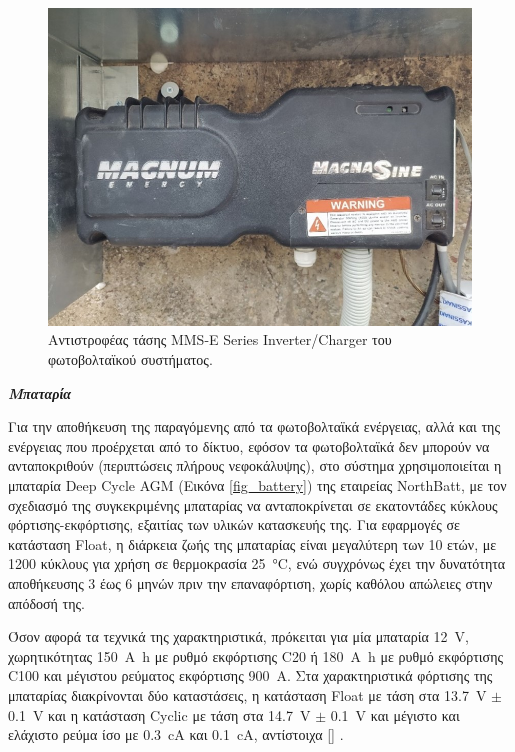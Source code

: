 \documentclass[12pt, a4paper]{report} %
\DeclareRobustCommand{\lcitep}[1]{%
  \english{[\cite{#1}]}%
}
\newcommand{\english}{\foreignlanguage{english}}
\begin{document}
\begin{figure}[ht]%
    \centering
    \includegraphics[scale=0.9]{Figures/inverter.jpg}
    \caption{Αντιστροφέας τάσης \english{MMS-E Series Inverter/Charger} του φωτοβολταϊκού συστήματος.}
    \label{fig_inverter}
\end{figure}

\noindent \textit{\textbf{Μπαταρία}}

\vspace{0.2cm}

Για την αποθήκευση της παραγόμενης από τα φωτοβολταϊκά ενέργειας, αλλά και της ενέργειας που προέρχεται από το δίκτυο, 
εφόσον τα φωτοβολταϊκά δεν μπορούν να ανταποκριθούν (περιπτώσεις πλήρους νεφοκάλυψης), στο σύστημα χρησιμοποιείται η 
μπαταρία \english{Deep Cycle AGM} (Εικόνα \ref{fig_battery}) της εταιρείας \english{NorthBatt}, με τον σχεδιασμό της 
συγκεκριμένης μπαταρίας να ανταποκρίνεται σε εκατοντάδες κύκλους φόρτισης-εκφόρτισης, εξαιτίας των υλικών κατασκευής της. 
Για εφαρμογές σε κατάσταση \english{Float}, η διάρκεια ζωής της μπαταρίας είναι μεγαλύτερη των 10 ετών, με 1200 κύκλους 
για χρήση σε θερμοκρασία \SI{25}{\degreeCelsius}, ενώ συγχρόνως έχει την δυνατότητα αποθήκευσης 3 έως 6 μηνών πριν την 
επαναφόρτιση, χωρίς καθόλου απώλειες στην απόδοσή της.

Όσον αφορά τα τεχνικά της χαρακτηριστικά, πρόκειται για μία μπαταρία \SI{12}{\volt}, χωρητικότητας \SI{150}{\ampere\hour} 
με ρυθμό εκφόρτισης \english{C20} ή \SI{180}{\ampere\hour} με ρυθμό εκφόρτισης \english{C100} και μέγιστου ρεύματος 
εκφόρτισης \SI{900}{\ampere}. Στα χαρακτηριστικά φόρτισης της μπαταρίας διακρίνονται δύο καταστάσεις, η κατάσταση 
\english{Float} με τάση στα \SI{13,7}{\volt} $\pm$ \SI{0,1}{\volt} και η κατάσταση \english{Cyclic} με τάση στα 
\SI{14,7}{\volt} $\pm$ \SI{0,1}{\volt} και μέγιστο και ελάχιστο ρεύμα ίσο με \SI{0,3}{\centi\ampere} και 
\SI{0,1}{\centi\ampere}, αντίστοιχα \lcitep{diataksi_bib9}. 
\end{document}
